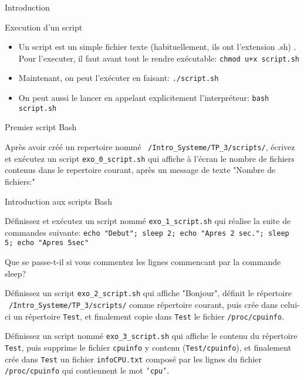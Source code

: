 \begin{frame}[fragile]{Introduction}
  \begin{block}{Execution d'un script}
    \begin{itemize}
    \item Un script est un simple fichier texte (habituellement, ils ont l'extension \alert{.sh}) . Pour l'executer, il faut avant tout le rendre exécutable: \verb|chmod u+x script.sh|
    \item Maintenant, on peut l'exécuter en faisant: \verb|./script.sh|
    \item On peut aussi le lancer en appelant explicitement l'interpréteur: \verb|bash script.sh|
    \end{itemize}
  \end{block}


  \begin{exercicelet}{Premier script Bash}
    \begin{questions}
    \item Après avoir créé un repertoire nommé \texttt{~/Intro\_Systeme/TP\_3/scripts/}, écrivez et exécutez un script \texttt{exo\_0\_script.sh} qui affiche à l'écran le nombre de fichiers contenus dans le repertoire courant, après un message de texte "Nombre de fichiers:"
    \end{questions}
  \end{exercicelet}


\end{frame}


\begin{exercice}
  \begin{exercicelet}{Introduction aux scripts Bash}
    \begin{questions}
    \item Définissez et exécutez un script nommé \texttt{exo\_1\_script.sh} qui réalise la suite de commandes suivante: \texttt{echo "Debut"; sleep 2; echo "Apres 2 sec."; sleep 5; echo "Apres 5sec"}
    \item Que se passe-t-il si vous commentez les lignes commencant par la commande sleep?
    \item Définissez un script \texttt{exo\_2\_script.sh} qui affiche "Bonjour", définit le répertoire \texttt{~/Intro\_Systeme/TP\_3/scripts/} comme répertoire courant, puis crée dans celui-ci un répertoire \texttt{Test}, et finalement copie dans \texttt{Test} le fichier \texttt{/proc/cpuinfo}.
    \item Définissez un script nommé \texttt{exo\_3\_script.sh} qui affiche le contenu du répertoire \texttt{Test}, puis supprime le fichier \texttt{cpuinfo} y contenu (\texttt{Test/cpuinfo}), et finalement crée dans \texttt{Test} un fichier \texttt{infoCPU.txt} composé par les lignes du fichier \texttt{/proc/cpuinfo} qui contiennent le mot \texttt{'cpu'}.
    \end{questions}
  \end{exercicelet}
\end{exercice}

